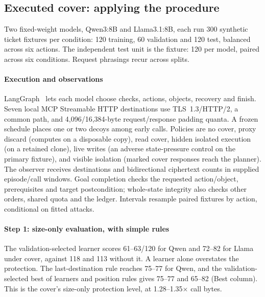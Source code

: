\subsection{Executed cover: applying the procedure}\label{sec:cover-study}
Two fixed-weight models, Qwen3:8B and Llama3.1:8B, each run 300 synthetic ticket fixtures per condition: 120 training, 60 validation and 120 test, balanced across six actions. The independent test unit is the fixture: 120 per model, paired across six conditions. Request phrasings recur across splits.

\paragraph{Execution and observations}
LangGraph~\cite{langchain2025langgraph} lets each model choose checks, actions, objects, recovery and finish. Seven local MCP Streamable HTTP destinations use TLS~1.3/HTTP/2, a common  path, and 4,096/16,384-byte request/response padding quanta. A frozen schedule places one or two decoys among early calls. Policies are no cover, proxy discard (computes on a disposable copy), read cover, hidden isolated execution (on a retained clone), live writes (an adverse state-pressure control on the primary fixture), and visible isolation (marked cover responses reach the planner). The observer receives destinations and bidirectional ciphertext counts in supplied episode/call windows. Goal completion checks the requested action/object, prerequisites and target postcondition; whole-state integrity also checks other orders, shared quota and the ledger. Intervals resample paired fixtures by action, conditional on fitted attacks.



\paragraph{Step 1: size-only evaluation, with simple rules}
The validation-selected learner scores 61--63/120 for Qwen and 72--82 for Llama under cover, against 118 and 113 without it. A learner alone overstates the protection. The last-destination rule reaches 75--77 for Qwen, and the validation-selected best of learners and position rules gives 75--77 and 65--82 (Best column). This is the cover's size-only protection level, at 1.28--1.35$\times$ call bytes.

